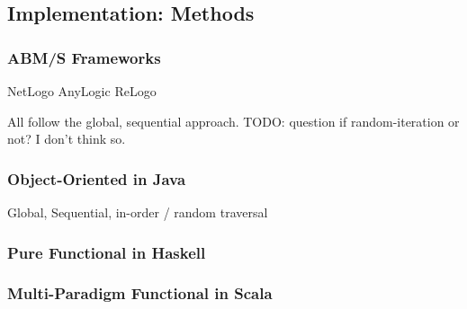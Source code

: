 \subsection{Implementation: Methods}

\subsubsection{ABM/S Frameworks}
NetLogo
AnyLogic
ReLogo

All follow the global, sequential approach. TODO: question if random-iteration or not? I don't think so.

\subsubsection{Object-Oriented in Java}
Global, Sequential, in-order / random traversal

\subsubsection{Pure Functional in Haskell}


\subsubsection{Multi-Paradigm Functional in Scala}
